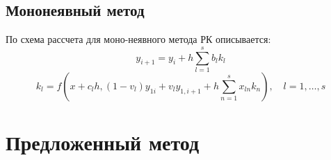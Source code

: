 \documentclass[a4paper,article,14pt]{extarticle}
\begin{document}
\subsection{Мононеявный метод}\label{subsecMIRK}
По \cite{mirk} схема рассчета для моно-неявного метода РК описывается:
\begin{equation}
    y_{i+1} = y_{i} + h \sum_{l=1}^{s} b_{l} k_{l}
\end{equation}
\begin{equation}
    k_{l} = 
    f(x + c_{l} h, (1 - v_{l}) y_{1i} + v_{l} y_{1,i+1} + h \sum_{n=1}^{s} x_{ln} k_{n}), \quad l = 1, \dotsc, s
\end{equation}
\pagebreak

\section{Предложенный метод}
\end{document}
